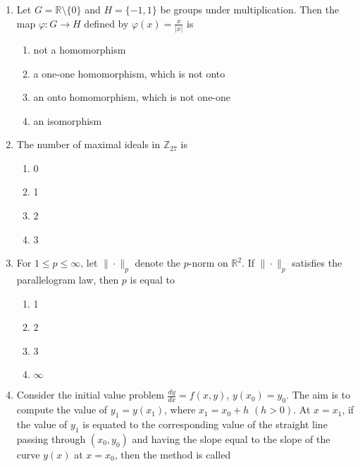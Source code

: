 \documentclass[journal,12pt,onecolumn]{IEEEtran}
\theoremstyle{remark}
\begin{document}
\begin{enumerate}
\item Let $G = \mathbb{R} \setminus \{ 0 \}$ and $H = \{ -1, 1 \}$ be groups under multiplication. Then the map $\varphi : G \to H$ defined by $\varphi(x) = \frac{x}{|x|}$ is 
\\[-0.3em]\makebox[\textwidth][r]{\textit{[GATE EE 2025]}}

\begin{multicols}{2}
\begin{enumerate}[label=(\Alph*)]
\item not a homomorphism
\item a one-one homomorphism, which is not onto
\item an onto homomorphism, which is not one-one
\item an isomorphism
\end{enumerate}
\end{multicols}


\item The number of maximal ideals in $\mathbb{Z}_{27}$ is
\\[-0.3em]\makebox[\textwidth][r]{\textit{[GATE EE 2025]}}

\begin{enumerate}
\item 0
\item 1
\item 2
\item 3
\end{enumerate}


\item For $1 \le p \le \infty$, let $\| \cdot \|_p$ denote the $p$-norm on $\mathbb{R}^2$. If $\| \cdot \|_p$ satisfies the parallelogram law, then $p$ is equal to
\\[-0.3em]\makebox[\textwidth][r]{\textit{[GATE EE 2025]}}

\begin{enumerate}
\item 1
\item 2
\item 3
\item $\infty$
\end{enumerate}

\item Consider the initial value problem $\frac{dy}{dx} = f(x,y)$, $y(x_0) = y_0$. The aim is to compute the value of $y_1 = y(x_1)$, where $x_1 = x_0 + h$ $(h > 0)$. At $x = x_1$, if the value of $y_1$ is equated to the corresponding value of the straight line passing through $(x_0, y_0)$ and having the slope equal to the slope of the curve $y(x)$ at $x = x_0$, then the method is called
\\[-0.3em]\makebox[\textwidth][r]{\textit{[GATE EE 2025]}}


\end{enumerate}
\end{document}
